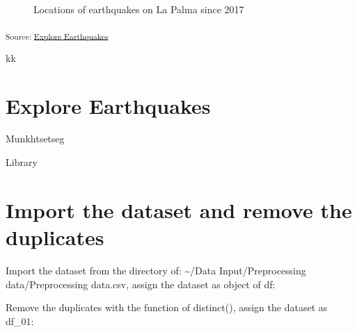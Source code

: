 \documentclass[
]{agujournal2019}
\begin{document}
\begin{figure}[H]


\caption{\label{fig-spatial-plot}Locations of earthquakes on La Palma
since 2017}

\end{figure}%

\textsubscript{Source:
\href{https://EmouAcademy.github.io/my-awesome-manuscripts/notebooks/explore-earthquakes-preview.html\#cell-fig-spatial-plot}{Explore
Earthquakes}}

kk

\section{Explore Earthquakes}\label{explore-earthquakes}

Munkhtsetseg

Library

\section{Import the dataset and remove the
duplicates}\label{import-the-dataset-and-remove-the-duplicates-1}

Import the dataset from the directory of: \textasciitilde/Data
Input/Preprocessing data/Preprocessing data.csv, assign the dataset as
object of df:

Remove the duplicates with the function of distinct(), assign the
dataset as df\_01:
\end{document}
